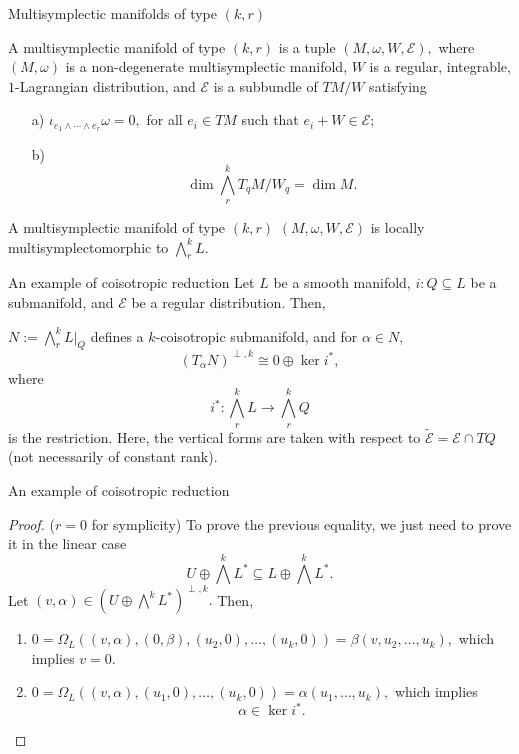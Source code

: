 \begin{frame}{Multisymplectic manifolds of type $(k,r)$}
\begin{definition} A \alert{multisymplectic manifold} of type $(k,r)$ is a tuple $(M, \omega, W, \mathcal{E}),$ where $(M,\omega)$ is a non-degenerate multisymplectic manifold, $W$ is a regular, integrable, $1$-Lagrangian distribution, and $\mathcal{E}$ is a subbundle of $TM/W$ satisfying
\begin{itemize}
    \item[a)]$\iota_{e_1 \wedge \cdots \wedge e_r} \omega = 0,$ for all $e_i \in TM$ such that $e_i + W \in \mathcal{E};$
    \item[b)] $$\dim \bigwedge^k_r T_qM/ W_q = \dim M.$$
\end{itemize}
\end{definition}
\pause
\begin{theorem} A multisymplectic manifold of type $(k,r)$ $(M, \omega, W, \mathcal{E})$ is locally multisymplectomorphic to $\bigwedge^k_r L$.
\end{theorem}
\end{frame}
\begin{frame}{An example of coisotropic reduction}
    Let $L$ be a smooth manifold, $i: Q \subseteq L$ be a submanifold, and $\mathcal{E}$ be a regular distribution. \pause Then,

    \begin{proposition} $N := \bigwedge^ k_r L \big |_Q$ defines a $k$-coisotropic submanifold, and for $\alpha \in N$, $$\left( T_{\alpha}N\right)^{\perp, k} \cong 0 \oplus \ker i^\ast,$$ where $$i^\ast: \bigwedge^k_r L \rightarrow \bigwedge^k_r Q$$ is the restriction. Here, the vertical forms are taken with respect to $\widetilde{\mathcal{E}} = \mathcal{E} \cap TQ$ (not necessarily of constant rank).
    \end{proposition}
\end{frame}
\begin{frame}{An example of coisotropic reduction}
    \begin{proof} ($r = 0$ for symplicity) To prove the previous equality, we just need to prove it in the linear case $$U \oplus \bigwedge^k L^\ast \subseteq L \oplus \bigwedge^k L^\ast.$$ Let $(v, \alpha) \in (U \oplus \bigwedge^k L^\ast) ^{\perp, k}.$ Then,
    \begin{enumerate}
        \item  $0 = \Omega_L((v, \alpha), (0, \beta), (u_2, 0), \dots, (u_k, 0)) = \beta(v, u_2, \dots, u_k),$ which implies $v = 0$.\pause
        \item $0 = \Omega_L((v, \alpha), (u_1,0), \dots, (u_k, 0)) = \alpha(u_1, \dots, u_k),$ which implies $$\alpha \in \ker i^\ast.$$
    \end{enumerate}
    \end{proof}
\end{frame}

